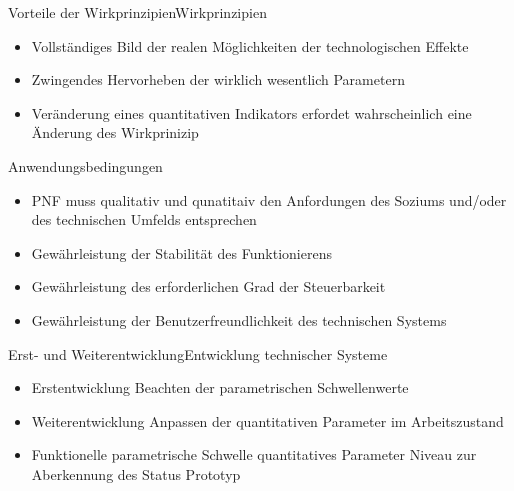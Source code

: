 \documentclass[aspectratio=169]{beamer}
\begin{document}
    \begin{frame}{Vorteile der Wirkprinzipien}{Wirkprinzipien}
        \begin{itemize}
            \item Vollständiges Bild der realen Möglichkeiten der technologischen Effekte
            \item Zwingendes Hervorheben der wirklich wesentlich Parametern
            \item Veränderung eines quantitativen Indikators erfordet wahrscheinlich eine Änderung des Wirkprinizip
        \end{itemize}
    \end{frame}

    \begin{frame}{Anwendungsbedingungen}
        \begin{itemize}
            \item PNF muss qualitativ und qunatitaiv den Anfordungen des Soziums und/oder des technischen Umfelds entsprechen
            \item Gewährleistung der Stabilität des Funktionierens
            \item Gewährleistung des erforderlichen Grad der Steuerbarkeit
            \item Gewährleistung der Benutzerfreundlichkeit des technischen Systems
        \end{itemize}
    \end{frame}

    \begin{frame}{Erst- und Weiterentwicklung}{Entwicklung technischer Systeme}
        \begin{itemize}
            \item Erstentwicklung \newline
            {\scriptsize Beachten der parametrischen Schwellenwerte}
            \item Weiterentwicklung \newline
            {\scriptsize Anpassen der quantitativen Parameter im Arbeitszustand}
        \end{itemize}
        \vfill
        \begin{itemize}
            \item Funktionelle parametrische Schwelle \newline
            {\scriptsize quantitatives Parameter Niveau zur Aberkennung des Status \glqq Prototyp\grqq}
        \end{itemize}
    \end{frame}
\end{document}
